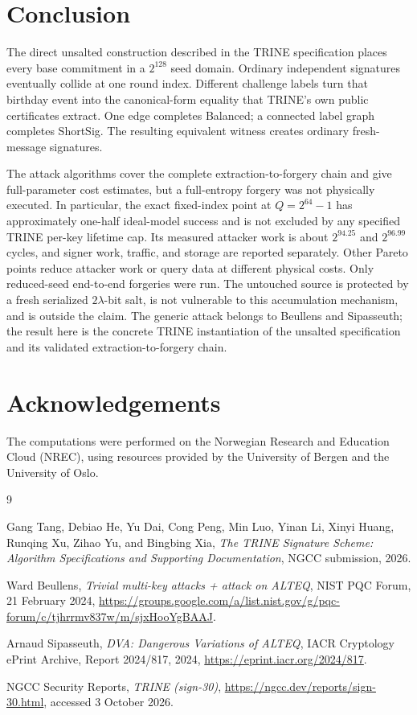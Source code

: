 \documentclass[11pt,a4paper]{article}
\begin{document}
\section{Conclusion}

The direct unsalted construction described in the TRINE specification places
every base commitment in a $2^{128}$ seed domain.  Ordinary independent
signatures eventually collide at
one round index.  Different challenge labels turn that birthday event into the
canonical-form equality that TRINE's own public certificates extract.  One
edge completes Balanced; a connected label graph completes ShortSig.  The
resulting equivalent witness creates ordinary fresh-message signatures.

The attack algorithms cover the complete extraction-to-forgery chain and give
full-parameter cost estimates, but a full-entropy forgery was not physically
executed.  In particular, the exact fixed-index point at $Q=2^{64}-1$ has
approximately one-half ideal-model success and is not excluded by any
specified TRINE per-key lifetime cap.  Its measured attacker work is about
$2^{94.25}$ and $2^{96.99}$ cycles, and signer work, traffic, and storage are
reported separately.  Other Pareto points reduce attacker work or query data
at different physical costs.  Only reduced-seed end-to-end forgeries were
run.  The untouched source is protected by a fresh serialized
$2\lambda$-bit salt, is not vulnerable to this accumulation mechanism, and is
outside the claim.  The generic attack belongs to Beullens and Sipasseuth; the
result here is the concrete TRINE instantiation of the unsalted specification
and its validated extraction-to-forgery chain.

\section*{Acknowledgements}

The computations were performed on the Norwegian Research and Education Cloud
(NREC), using resources provided by the University of Bergen and the University
of Oslo.

\begin{thebibliography}{9}
\small

Gang Tang, Debiao He, Yu Dai, Cong Peng, Min Luo, Yinan Li, Xinyi Huang,
Runqing Xu, Zihao Yu, and Bingbing Xia,
\emph{The TRINE Signature Scheme: Algorithm Specifications and Supporting
Documentation}, NGCC submission, 2026.

Ward Beullens,
\emph{Trivial multi-key attacks + attack on ALTEQ},
NIST PQC Forum, 21 February 2024,
\url{https://groups.google.com/a/list.nist.gov/g/pqc-forum/c/tjhrrmv837w/m/sjxHooYgBAAJ}.

Arnaud Sipasseuth,
\emph{DVA: Dangerous Variations of ALTEQ},
IACR Cryptology ePrint Archive, Report 2024/817, 2024,
\url{https://eprint.iacr.org/2024/817}.

NGCC Security Reports,
\emph{TRINE (sign-30)},
\url{https://ngcc.dev/reports/sign-30.html}, accessed 3 October 2026.

\end{thebibliography}
\end{document}
